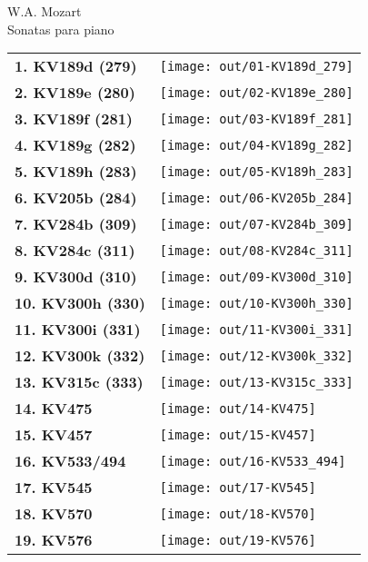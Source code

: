 \documentclass[a4paper,13pt,oneside,headinclude,titlepage]{article} %
\newcommand{\imgw}{0.67}
\newcommand{\tn}{\\[1ex]}
\begin{document}
\begin{center}
\vfill
{\huge W.A. Mozart}\\[1ex]
{\huge Sonatas para piano}\\[1ex]
\vfill
\begin{tabular}{>{\bfseries}m{3cm}l}
1. KV189d (279)&\texttt{[image: out/01-KV189d\_279]}\tn
2. KV189e (280)&\texttt{[image: out/02-KV189e\_280]}\tn
3. KV189f (281)&\texttt{[image: out/03-KV189f\_281]}\tn
4. KV189g (282)&\texttt{[image: out/04-KV189g\_282]}\tn
5. KV189h (283)&\texttt{[image: out/05-KV189h\_283]}\tn
6. KV205b (284)&\texttt{[image: out/06-KV205b\_284]}\tn
7. KV284b (309)&\texttt{[image: out/07-KV284b\_309]}\tn
8. KV284c (311)&\texttt{[image: out/08-KV284c\_311]}\tn
9. KV300d (310)&\texttt{[image: out/09-KV300d\_310]}\tn
10. KV300h (330)&\texttt{[image: out/10-KV300h\_330]}\tn
11. KV300i (331)&\texttt{[image: out/11-KV300i\_331]}\tn
12. KV300k (332)&\texttt{[image: out/12-KV300k\_332]}\tn
13. KV315c (333)&\texttt{[image: out/13-KV315c\_333]}\tn
14. KV475&\texttt{[image: out/14-KV475]}\tn
15. KV457&\texttt{[image: out/15-KV457]}\tn
16. KV533/494&\texttt{[image: out/16-KV533\_494]}\tn
17. KV545&\texttt{[image: out/17-KV545]}\tn
18. KV570&\texttt{[image: out/18-KV570]}\tn
19. KV576&\texttt{[image: out/19-KV576]}\tn
\end{tabular}
\end{center}
\vfill
\end{document}
